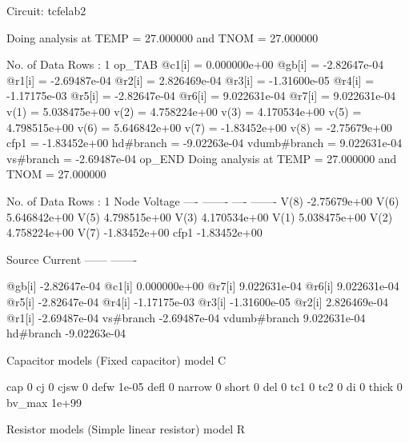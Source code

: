 
Circuit: tcfelab2

Doing analysis at TEMP = 27.000000 and TNOM = 27.000000


No. of Data Rows : 1
op_TAB
@c1[i] = 0.000000e+00
@gb[i] = -2.82647e-04
@r1[i] = -2.69487e-04
@r2[i] = 2.826469e-04
@r3[i] = -1.31600e-05
@r4[i] = -1.17175e-03
@r5[i] = -2.82647e-04
@r6[i] = 9.022631e-04
@r7[i] = 9.022631e-04
v(1) = 5.038475e+00
v(2) = 4.758224e+00
v(3) = 4.170534e+00
v(5) = 4.798515e+00
v(6) = 5.646842e+00
v(7) = -1.83452e+00
v(8) = -2.75679e+00
cfp1 = -1.83452e+00
hd#branch = -9.02263e-04
vdumb#branch = 9.022631e-04
vs#branch = -2.69487e-04
op_END
Doing analysis at TEMP = 27.000000 and TNOM = 27.000000


No. of Data Rows : 1
	Node                                  Voltage
	----                                  -------
	----	-------
	V(8)                             -2.75679e+00
	V(6)                             5.646842e+00
	V(5)                             4.798515e+00
	V(3)                             4.170534e+00
	V(1)                             5.038475e+00
	V(2)                             4.758224e+00
	V(7)                             -1.83452e+00
	cfp1                             -1.83452e+00

	Source	Current
	------	-------

	@gb[i]                           -2.82647e-04
	@c1[i]                           0.000000e+00
	@r7[i]                           9.022631e-04
	@r6[i]                           9.022631e-04
	@r5[i]                           -2.82647e-04
	@r4[i]                           -1.17175e-03
	@r3[i]                           -1.31600e-05
	@r2[i]                           2.826469e-04
	@r1[i]                           -2.69487e-04
	vs#branch                        -2.69487e-04
	vdumb#branch                     9.022631e-04
	hd#branch                        -9.02263e-04

 Capacitor models (Fixed capacitor)
      model                     C

        cap                     0
         cj                     0
       cjsw                     0
       defw                 1e-05
       defl                     0
     narrow                     0
      short                     0
        del                     0
        tc1                     0
        tc2                     0
         di                     0
      thick                     0
     bv_max                 1e+99

 Resistor models (Simple linear resistor)
      model                     R

